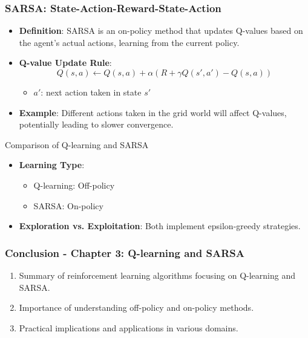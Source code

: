 \documentclass[aspectratio=169]{beamer}
\begin{document}
\begin{frame}[fragile]
    \frametitle{SARSA: State-Action-Reward-State-Action}
    \begin{itemize}
        \item \textbf{Definition}: 
        SARSA is an on-policy method that updates Q-values based on the agent's actual actions, learning from the current policy.
        \item \textbf{Q-value Update Rule}:
        \begin{equation}
        Q(s, a) \leftarrow Q(s, a) + \alpha \left( R + \gamma Q(s', a') - Q(s, a) \right)
        \end{equation}
        \begin{itemize}
            \item \( a' \): next action taken in state \( s' \)
        \end{itemize}
        \item \textbf{Example}:
        Different actions taken in the grid world will affect Q-values, potentially leading to slower convergence.
    \end{itemize}
    
    \begin{block}{Comparison of Q-learning and SARSA}
        \begin{itemize}
            \item \textbf{Learning Type}:
            \begin{itemize}
                \item Q-learning: Off-policy
                \item SARSA: On-policy
            \end{itemize}
            \item \textbf{Exploration vs. Exploitation}: Both implement epsilon-greedy strategies.
        \end{itemize}
    \end{block}
\end{frame}

\begin{frame}[fragile]
    \frametitle{Conclusion - Chapter 3: Q-learning and SARSA}
    \begin{enumerate}
        \item Summary of reinforcement learning algorithms focusing on Q-learning and SARSA.
        \item Importance of understanding off-policy and on-policy methods.
        \item Practical implications and applications in various domains.
    \end{enumerate}
\end{frame}
\end{document}
